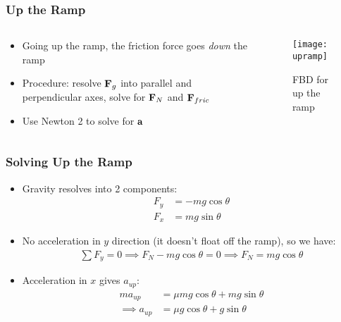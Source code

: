 \documentclass[aspectratio=169]{beamer}
\begin{document}
\begin{frame}
  \frametitle{Up the Ramp}
  \begin{columns}
    \begin{column}{0.5\textwidth}
      \begin{itemize}
      \item Going up the ramp, the friction force goes \emph{down} the ramp
      \item Procedure: resolve $\vb{F}_g$ into parallel and perpendicular axes, solve for $\vb{F}_{N}$ and $\vb{F}_{fric}$
      \item Use Newton 2 to solve for $\vb{a}$
      \end{itemize}
    \end{column}
    \begin{column}{0.5\textwidth}
      \begin{figure}[H]
        \centering
        \texttt{[image: upramp]}
        \caption{FBD for up the ramp}
      \end{figure}
    \end{column}
  \end{columns}
\end{frame}

\begin{frame}
  \frametitle{Solving Up the Ramp}
  \begin{itemize}
  \item Gravity resolves into 2 components:
    \begin{align*}
      F_{y}&=-mg\cos\theta\\
      F_{x}&= mg\sin\theta
    \end{align*}
  \item No acceleration in $y$ direction (it doesn't float off the ramp), so we have:
    \begin{align*}
      \sum F_y=0\implies F_N-mg\cos\theta=0\implies F_N=mg\cos\theta
    \end{align*}
  \item Acceleration in $x$ gives $a_{up}$:
    \begin{align*}
      ma_{up}&=\mu mg\cos\theta+mg\sin\theta\\
      \implies a_{up}&=\mu g\cos\theta+g\sin\theta
    \end{align*}
  \end{itemize}
\end{frame}
\end{document}
